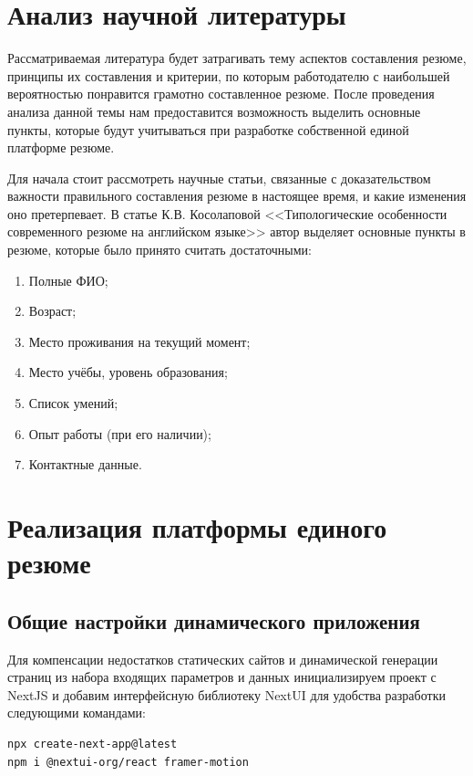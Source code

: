 \documentclass[master, och, pract]{SCWorks}
\begin{document}
\section{Анализ научной литературы}
Рассматриваемая литература будет затрагивать тему аспектов составления резюме, 
принципы их составления и критерии, по которым работодателю с наибольшей вероятностью 
понравится грамотно составленное резюме. После проведения анализа данной темы нам 
предоставится возможность выделить основные пункты, которые будут учитываться 
при разработке собственной единой платформе резюме.

Для начала стоит рассмотреть научные статьи, связанные с доказательством важности 
правильного составления резюме в настоящее время, и какие изменения  оно претерпевает. 
В статье К.В. Косолаповой <<Типологические особенности современного резюме на английском 
языке>> автор выделяет основные пункты в резюме, которые было принято считать достаточными:
\begin{enumerate}
    \item Полные ФИО;
    \item Возраст;
    \item Место проживания на текущий момент;
    \item Место учёбы, уровень образования;
    \item Список умений;
    \item Опыт работы (при его наличии);
    \item Контактные данные.\cite{Gridneva_2021}
\end{enumerate}














\section{Реализация платформы единого резюме}
\subsection{Общие настройки динамического приложения}
Для компенсации недостатков статических сайтов и динамической генерации страниц из набора входящих параметров и данных инициализируем проект с NextJS и добавим интерфейсную библиотеку NextUI для удобства разработки следующими командами:
\begin{verbatim}
npx create-next-app@latest
npm i @nextui-org/react framer-motion
\end{verbatim}
\end{document}
